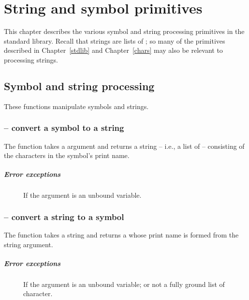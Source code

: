 \chapter{String and symbol primitives}
\label{strings}

This chapter describes the various symbol and string processing primitives in the \go standard library. Recall that \go strings are lists of ; so many of the primitives described in Chapter~\vref{stdlib} and Chapter~\vref{chars} may also be relevant to processing strings.

\section{Symbol and string processing}
\label{stirng:symbol}

These functions manipulate symbols and strings.

\subsection{ -- convert a symbol to a string}
\label{string:explode}


The  function takes a  argument and returns a string -- i.e., a list of  -- consisting of the characters in the symbol's print name.

\paragraph{Error exceptions}
\begin{description}
\item[]
If the argument is an unbound variable.
\end{description}

\subsection{ -- convert a string to a symbol}
\label{string:implode}


The  function takes a string and returns a   whose print name is formed from the string argument.

\paragraph{Error exceptions}
\begin{description}
\item[]
If the argument is an unbound variable; or not a fully ground list of character.
\end{description}

